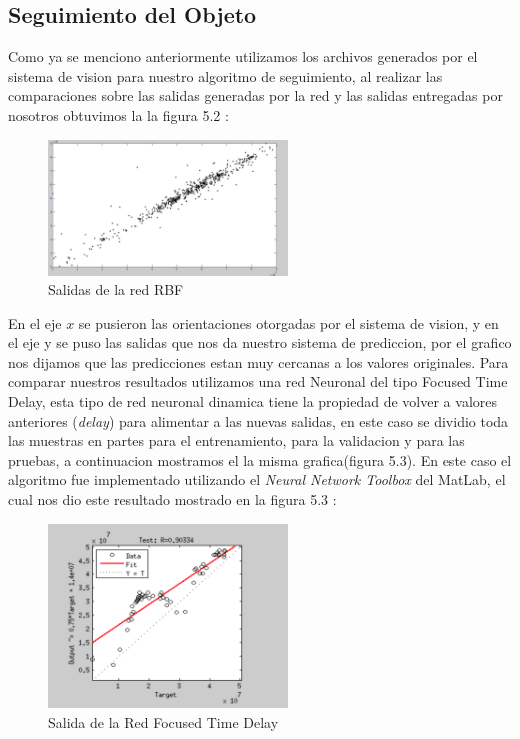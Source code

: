 \documentclass[conference]{IEEEtran}
\begin{document}
\subsection{Seguimiento del Objeto}
Como  ya se menciono anteriormente utilizamos los archivos generados por el sistema de vision para nuestro algoritmo de seguimiento, al realizar las comparaciones sobre las salidas generadas por la red y las salidas entregadas por nosotros obtuvimos la la figura 5.2 :
\begin{figure}
	\centering
	\includegraphics[width=2.5in]{salidaRBF.pdf}
	\caption{Salidas de la red RBF}
	\label{fig_mar}
\end{figure}
En el eje $x$ se pusieron las orientaciones otorgadas por el sistema de vision, y en el eje y se puso las salidas que nos da nuestro sistema de prediccion, por el grafico nos dijamos que las predicciones estan muy cercanas a los valores originales.
Para comparar nuestros resultados utilizamos una red Neuronal del tipo Focused Time Delay, esta tipo de red neuronal dinamica tiene la propiedad de volver a valores anteriores (\textit{delay}) para alimentar a las nuevas salidas, en este caso se dividio toda las muestras en partes para el entrenamiento, para la validacion y para las pruebas, a continuacion mostramos el la misma grafica(figura 5.3). En este caso el algoritmo fue implementado utilizando el  \textit{Neural Network Toolbox} del MatLab, el cual nos dio este resultado mostrado en la figura 5.3 :
\begin{figure}
	\centering
	\includegraphics[width=2.5in]{salidaNAR.pdf}
	\caption{Salida de la Red Focused Time Delay}
	\label{fig_mar}
\end{figure}
\end{document}
